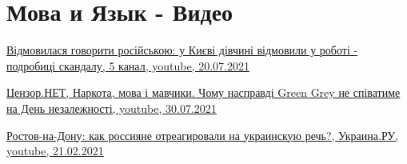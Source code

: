  
 
 
 
 
\section{Мова и Язык - Видео}
\label{sec:topics.mova_jazyk.videos}

\href{https://www.youtube.com/watch?v=swb22_gGNMo}{%
Відмовилася говорити російською: у Києві дівчині відмовили у роботі - подробиці скандалу,%
5 канал, youtube, 20.07.2021%
}

\href{https://www.youtube.com/watch?v=7C4h6jjCyFc}{%
Цензор.НЕТ, Наркота, мова і мавчики. Чому насправді Green Grey не співатиме на День незалежності, youtube, 30.07.2021%
}

\href{https://www.youtube.com/watch?v=gxZeNPXA4cU}{%
Ростов-на-Дону: как россияне отреагировали на украинскую речь?, Украина.РУ, youtube, 21.02.2021%
}
